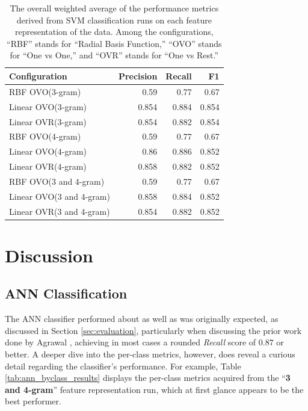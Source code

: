 \documentclass[conference]{sig-alternate-05-2015}
\begin{document}
\begin{table}[ht!]
  \centering
  \begin{tabular}{| l | r | r | r |}
    \hline
    \textbf{Configuration} & \textbf{Precision} & \textbf{Recall} & \textbf{F1} \\
    \hline\hline
    RBF OVO(3-gram) & 0.59 & 0.77 & 0.67 \\
    \hline
    Linear OVO(3-gram) & 0.854 & 0.884 & 0.854 \\
    \hline
    Linear OVR(3-gram) & 0.854 & 0.882 & 0.854 \\
    \hline
    RBF OVO(4-gram) & 0.59 & 0.77 & 0.67 \\
    \hline
    Linear OVO(4-gram) & 0.86 & 0.886 & 0.852 \\
    \hline
    Linear OVR(4-gram) & 0.858 & 0.882 & 0.852 \\
    \hline
    RBF OVO(3 and 4-gram) & 0.59 & 0.77 & 0.67 \\
    \hline
    Linear OVO(3 and 4-gram) & 0.858 & 0.884 & 0.852 \\
    \hline
    Linear OVR(3 and 4-gram) & 0.854 & 0.882 & 0.852 \\
    \hline
  \end{tabular}
  \caption{The overall weighted average of the performance metrics derived from
  SVM classification runs on each feature representation of the data. Among the
  configurations, ``RBF'' stands for ``Radial Basis Function,'' ``OVO'' stands
  for ``One vs One,'' and ``OVR'' stands for ``One vs Rest.''}
  \label{tab:svm_overall_results}
\end{table}

\section{Discussion}\label{sec:discussion}

\subsection{ANN Classification}\label{subsec:ann_discussion}

The ANN classifier performed about as well as was originally expected, as
discussed in Section \ref{sec:evaluation}, particularly when discussing the
prior work done by Agrawal \cite{agrawal2018deep}, achieving in most cases a
rounded \textit{Recall} score of $0.87$ or better. A deeper dive into the
per-class metrics, however, does reveal a curious detail regarding the
classifier's performance. For example, Table \ref{tab:ann_byclass_results}
displays the per-class metrics acquired from the ``\textbf{3 and 4-gram}''
feature representation run, which at first glance appears to be the best
performer.
\end{document}
